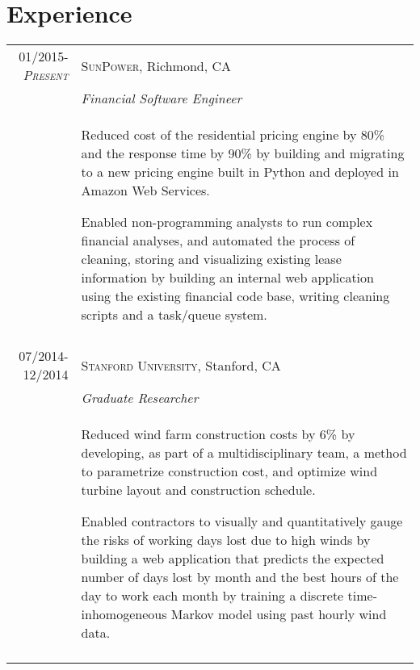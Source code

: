 \documentclass[a4paper,10pt]{article}
\begin{document}
\section{Experience}
\begin{tabularx}{\textwidth}{r|X}

\textsc{01/2015-\emph{Present} } &  \textsc{SunPower}, Richmond, CA \\&\emph{Financial Software Engineer}\\&\footnotesize{Reduced cost of the residential pricing engine by 80\% and the response time by 90\% by building and migrating to a new pricing engine built in Python and deployed in Amazon Web Services.

Enabled non-programming analysts to run complex financial analyses, and automated the process of cleaning, storing and visualizing existing lease information by building an internal web application using the existing financial code base, writing cleaning scripts and a task/queue system.}\\\multicolumn{2}{c}{} \\

\textsc{07/2014-12/2014} &  \textsc{Stanford University}, Stanford, CA \\&\emph{Graduate Researcher}\\&\footnotesize{
Reduced wind farm construction costs by 6\% by developing, as part of a multidisciplinary team, a method to parametrize construction cost, and optimize wind turbine layout and construction schedule. 

Enabled contractors to visually and quantitatively gauge the risks of working days lost due to high winds by building a web application that predicts the expected number of days lost by month and the best hours of the day to work each month by training a discrete time-inhomogeneous Markov model using past hourly wind data.
}\\\multicolumn{2}{c}{} \\




\end{tabularx}
\end{document}
